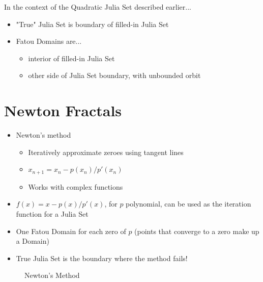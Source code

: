 \documentclass{article}
\begin{document}
In the context of the Quadratic Julia Set described earlier...
\begin{itemize}
    \item "True" Julia Set is boundary of filled-in Julia Set
    \item Fatou Domains are...
        \begin{itemize}
            \item interior of filled-in Julia Set
            \item other side of Julia Set boundary, with unbounded orbit
        \end{itemize}
\end{itemize}


\section{Newton Fractals}

\begin{itemize}
    \item Newton's method
    \begin{itemize}
        \item Iteratively approximate zeroes using tangent lines
        \item $x_{n+1} = x_n - p(x_n)/p'(x_n)$
        \item Works with complex functions
    \end{itemize}
    \item $f(x) = x - p(x)/p'(x)$, for $p$ polynomial, can be used as the iteration function for a Julia Set
    \item One Fatou Domain for each zero of $p$ (points that converge to a zero make up a Domain)
    \item True Julia Set is the boundary where the method fails!
\end{itemize}


\begin{figure}[!htbp]
    \centering
    \caption{Newton's Method} %
\end{figure}%


%
\end{document}
